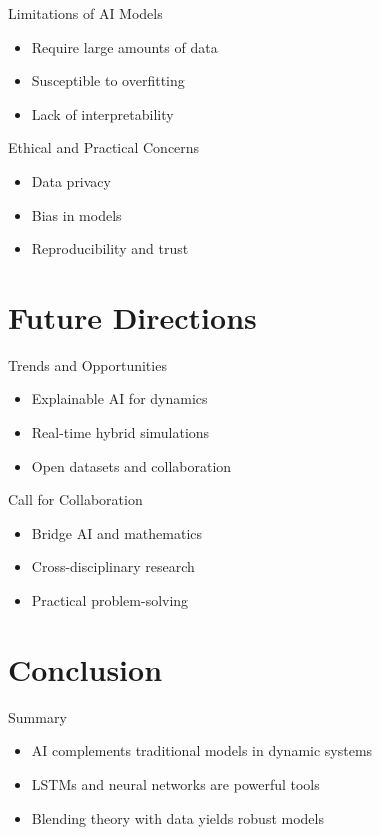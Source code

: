 \documentclass[xcolor=table]{beamer}
\begin{document}
\begin{frame}{Limitations of AI Models}
    \begin{itemize}
        \item Require large amounts of data
        \item Susceptible to overfitting
        \item Lack of interpretability
    \end{itemize}
\end{frame}

\begin{frame}{Ethical and Practical Concerns}
    \begin{itemize}
        \item Data privacy
        \item Bias in models
        \item Reproducibility and trust
    \end{itemize}
\end{frame}

\section{Future Directions}

\begin{frame}{Trends and Opportunities}
    \begin{itemize}
        \item Explainable AI for dynamics
        \item Real-time hybrid simulations
        \item Open datasets and collaboration
    \end{itemize}
\end{frame}

\begin{frame}{Call for Collaboration}
    \begin{itemize}
        \item Bridge AI and mathematics
        \item Cross-disciplinary research
        \item Practical problem-solving
    \end{itemize}
\end{frame}

\section{Conclusion}

\begin{frame}{Summary}
    \begin{itemize}
        \item AI complements traditional models in dynamic systems
        \item LSTMs and neural networks are powerful tools
        \item Blending theory with data yields robust models
    \end{itemize}
\end{frame}
\end{document}

